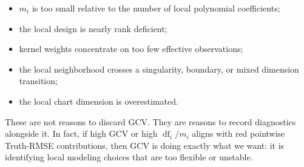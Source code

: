 \documentclass[11pt]{article}
\newcommand{\df}{\operatorname{df}}
\begin{document}
\begin{itemize}[leftmargin=*]
  \item \(m_i\) is too small relative to the number of local polynomial
  coefficients;
  \item the local design is nearly rank deficient;
  \item kernel weights concentrate on too few effective observations;
  \item the local neighborhood crosses a singularity, boundary, or mixed
  dimension transition;
  \item the local chart dimension is overestimated.
\end{itemize}

These are not reasons to discard GCV.  They are reasons to record diagnostics
alongside it.  In fact, if high GCV or high \(\df_i/m_i\) aligns with red
pointwise Truth-RMSE contributions, then GCV is doing exactly what we want: it
is identifying local modeling choices that are too flexible or unstable.
\end{document}
